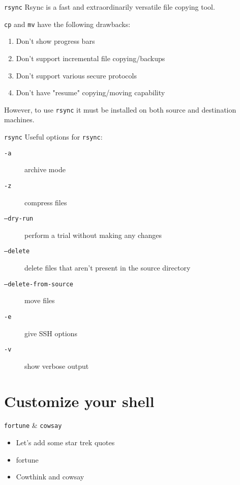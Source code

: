 \documentclass[11pt]{beamer}
\begin{document}
		\begin{frame}{ \texttt{rsync}}
			 Rsync is a fast and  extraordinarily  versatile  file  copying  tool.

			 \texttt{cp} and \texttt{mv} have the following drawbacks:
			 \begin{enumerate}
			 	\item Don't show progress bars
				\item Don't support incremental file copying/backups
				\item Don't support various secure protocols
				\item Don't have "resume" copying/moving capability
			 \end{enumerate}

			 However, to use \texttt{rsync} it must be installed on both source and destination machines.
		\end{frame}

		\begin{frame}{ \texttt{rsync}}
			Useful options for \texttt{rsync}:
			\begin{description}
				\item[ \texttt{-a}] archive mode
				\item[ \texttt{-z}] compress files
				\item[ \texttt{--dry-run}] perform a trial without making any changes
				\item[ \texttt{--delete}] delete files that aren't present in the source directory
				\item[ \texttt{--delete-from-source}] move files
				\item[ \texttt{-e}] give SSH options
				\item[ \texttt{-v}] show verbose output
			\end{description}
		\end{frame}

	\section[Bling]{Customize your shell}

		\begin{frame}{\texttt{fortune} \& \texttt{cowsay}}
			\begin{itemize}
				\item Let's add some star trek quotes
				\item fortune
				\item Cowthink and cowsay
			\end{itemize}
		\end{frame}
\end{document}
